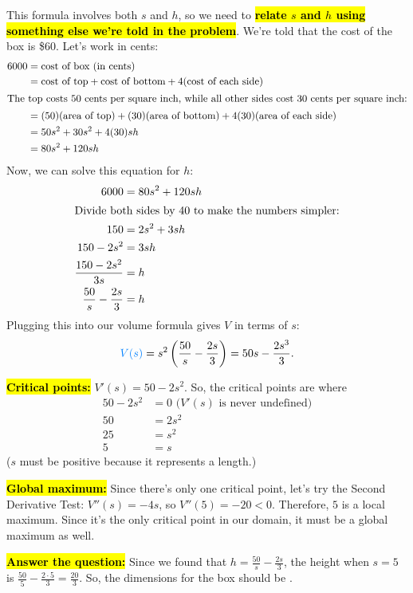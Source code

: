 \documentclass{article}
\newcommand{\highlight}[1]{\boldmath\hl{\textbf{#1}}\unboldmath}
\newcommand{\goal}[1]{\textbf{\textcolor{skyblue}{#1}}}
\begin{document}
\begin{enumerate}[resume]
\begin{solution}
    This formula involves both $s$ and $h$, so we need to \highlight{relate $s$ and $h$ using something else we're told in the problem}. We're told that the cost of the box is \$60. Let's work in cents:
    \begin{align*}
      6000 &= \textrm{cost of box (in cents)} \\
      &= \textrm{cost of top} + \textrm{cost of bottom} + 4 (\textrm{cost
        of each side}) \\
      \intertext{The top costs 50 cents per square inch, while all other
        sides cost 30 cents per square inch:}
      &= (50) (\textrm{area of top}) + (30) (\textrm{area of bottom}) + 4
      (30) 
      (\textrm{area of each side}) \\
      &= 50 s^2 + 30s^2 + 4 (30) sh \\
      &= 80s^2 + 120 sh
    \end{align*}
    Now, we can solve this equation for $h$:
    \begin{align*}
      6000 &= 80s^2 + 120sh \\
      \intertext{Divide both sides by 40 to make the numbers simpler:}
      150 &= 2 s^2 + 3 sh \\
      150 - 2s^2 &= 3sh \\
      \frac{150 - 2s^2}{3s} &= h \\
      \frac{50}{s} - \frac{2s}{3} &= h
    \end{align*}
    Plugging this into our volume formula gives $V$ in terms of $s$:
    \[ \goal{$V(s)$} = s^2 \left( \frac{50}{s} - \frac{2s}{3} \right) = 50 s - \frac{2s^3}{3}.\]

    \highlight{Critical points:} $V'(s) = 50 - 2s^2$. So, the critical points are where
    \begin{align*}
      50 - 2s^2 &= 0 \text{ ($V'(s)$ is never undefined)} \\
      50 &= 2s^2 \\
      25 &= s^2 \\
      5 &= s 
    \end{align*}
    ($s$ must be positive because it represents a length.)

    \highlight{Global maximum:} Since there's only one critical point, let's try the Second Derivative Test: $V''(s) = -4s$, so $V''(5) = -20 < 0$. Therefore, $5$ is a local maximum. Since it's the only critical point in our domain, it must be a global maximum as well.

    \highlight{Answer the question:} Since we found that $\displaystyle h = \frac{50}{s} - \frac{2s}{3}$, the height when $s = 5$ is $\displaystyle \frac{50}{5} - \frac{2 \cdot 5}{3} = \frac{20}{3}$. So, the dimensions for the box should be .
  \end{solution}


\end{enumerate}
\end{document}
